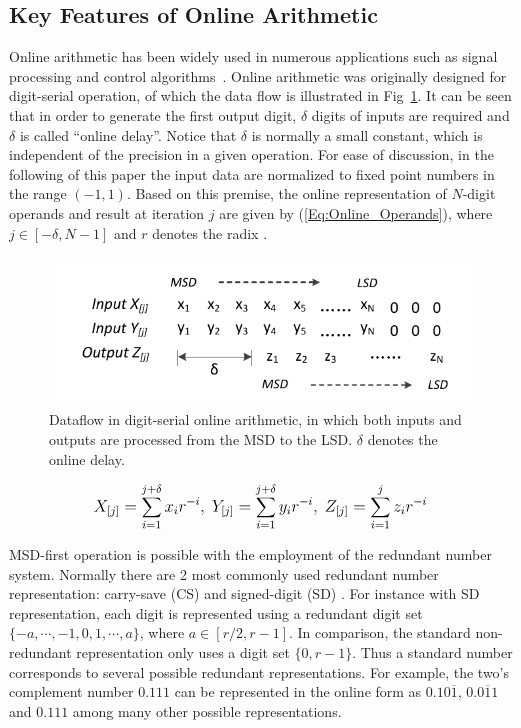 \documentclass[conference]{IEEEtran}
\begin{document}
\subsection{Key Features of Online Arithmetic}

Online arithmetic has been widely used in numerous applications such as signal processing and control algorithms~\cite{Online_FPGADSP,Online_Control}. Online arithmetic was originally designed for digit-serial operation, of which the data flow is illustrated in Fig~\ref{Fig:OnlineDataFlow}. It can be seen that in order to generate the first output digit, $\delta$ digits of inputs are required and $\delta$ is called ``online delay''. Notice that $\delta$ is normally a small constant, which is independent of the precision in a given operation. For ease of discussion, in the following of this paper the input data are normalized to fixed point numbers in the range $(-1,1)$. Based on this premise, the online representation of $N$-digit operands and result at iteration $j$ are given by (\ref{Eq:Online_Operands}), where $j\in[-\delta,N-1]$ and $r$ denotes the radix \cite{Ercegovac_Book}.
%
\begin{figure}[tbp]
  \centering
  \includegraphics[width=.48\textwidth]{./Figures/OnlineArithmetic_DataFlow.pdf}
  \caption{Dataflow in digit-serial online arithmetic, in which both inputs and outputs are processed from the MSD to the LSD. $\delta$ denotes the online delay.}
  \label{Fig:OnlineDataFlow}
\end{figure}
%
\begin{eqnarray}\label{Eq:Online_Operands}
\footnotesize
  X_{[j]}=\sum_{i=1}^{j+\delta}x_ir^{-i},~Y_{[j]}=\sum_{i=1}^{j+\delta}y_ir^{-i},~Z_{[j]}=\sum_{i=1}^{j}z_ir^{-i}
\normalsize
\end{eqnarray}

MSD-first operation is possible with the employment of the redundant number system. Normally there are 2 most commonly used redundant number representation: carry-save (CS) \cite{CSadder} and signed-digit (SD) \cite{RedundantNumber}. For instance with SD representation, each digit is represented using a redundant digit set $\{-a, \cdots,-1,0, 1, \cdots, a\}$, where $a\in[r/2,r-1]$. In comparison, the standard non-redundant representation only uses a digit set $\{0,r-1\}$. Thus a standard number corresponds to several possible redundant representations. For example, the two's complement number $0.111$ can be represented in the online form as $0.10\overline{1}$, $0.0\overline{1}1$ and $0.111$ among many other possible representations.
\end{document}
